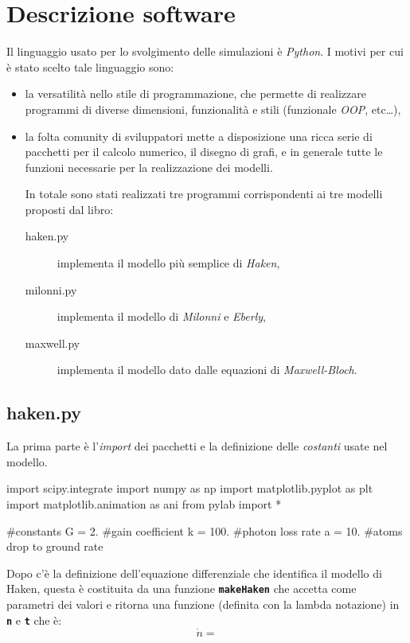 \documentclass[a4paper,oneside]{article}
\newcommand{\unicocode}[1]{\texttt{\bfseries #1}}
\newcommand{\codei}[1]{\unicocode{#1}}
\begin{document}
\section{Descrizione software}
Il linguaggio usato per lo svolgimento delle simulazioni \`e
\emph{Python}. I motivi per cui \`e stato scelto tale linguaggio sono:
\begin{itemize}
\item la versatilit\`a nello stile di programmazione, che permette di
  realizzare programmi di diverse dimensioni, funzionalità e stili
  (funzionale \emph{OOP}, etc\dots),
\item la folta comunity di sviluppatori mette a disposizione una ricca
  serie di pacchetti per il calcolo numerico, il disegno di grafi, e
  in generale tutte le funzioni necessarie per la realizzazione dei
  modelli.

In totale sono stati realizzati tre programmi corrispondenti ai tre
modelli proposti dal libro:
\begin{description}
\item[haken.py] implementa il modello più semplice di \emph{Haken},
\item[milonni.py] implementa il modello di \emph{Milonni} e
  \emph{Eberly},
\item[maxwell.py] implementa il modello dato dalle equazioni di
  \emph{Maxwell-Bloch}.
\end{description}

\end{itemize}
\subsection{haken.py}
La prima parte \`e l'\emph{import} dei pacchetti e la definizione
delle \emph{costanti} usate nel modello.
\begin{code}
import scipy.integrate
import numpy as np
import matplotlib.pyplot as plt
import matplotlib.animation as ani
from pylab import *

#constants
G = 2.      #gain coefficient
k = 100.    #photon loss rate
a = 10.     #atoms drop to ground rate
\end{code}

Dopo c'è la definizione dell'equazione differenziale che identifica il
modello di Haken, questa è costituita da una funzione
\codei{makeHaken} che accetta come parametri dei valori e ritorna una
funzione (definita con la lambda notazione) in \codei{n} e \codei{t}
che \`e:
$$
\dot{n} = 
$$
\end{document}
